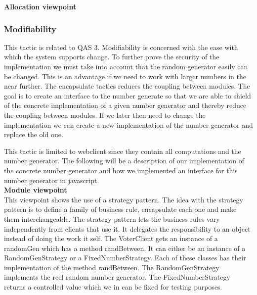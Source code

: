 \noindent
\textbf{Allocation viewpoint}\\


\noindent
\subsubsection{Modifiability}
This tactic is related to QAS 3. Modifiability is concerned with the ease with which the system supports change. To further prove the security of the implementation we must take into account that the random generator easily can be changed. This is an advantage if we need to work with larger numbers in the near further. The encapsulate tactics reduces the coupling between modules. The goal is to create an interface to the number generate so that we are able to shield of the concrete implementation of a given number generator and thereby reduce the coupling between modules. If  we later then need to change the implementation we can create a new implementation of the number generator and  replace the old one. 


\begin{center}
\end{center}

\noindent
This tactic is limited to webclient since they contain all computations and the number generator. The following will be a description of our implementation of the concrete number generator and how we implemented an interface for this number generator in javascript.\\


\noindent
\textbf{Module viewpoint}\\
This viewpoint shows the use of a strategy pattern. The idea with the strategy pattern is to define a family of business rule, encapsulate each one and make them interchangeable. The strategy pattern lets the business rules vary independently from clients that use it. It delegates the responsibility to an object instead of doing the work it self. The VoterClient gets an instance of a randomGen which has a method randBetween. It can either be an instance of a RandomGenStrategy or a FixedNumberStrategy. Each of these classes has their implementation of the method randBetween. The RandomGenStrategy implements the reel random number generator. The FixedNumberStrategy returns a controlled value which we in can be fixed for testing purposes.\\
\begin{center}
\end{center}






